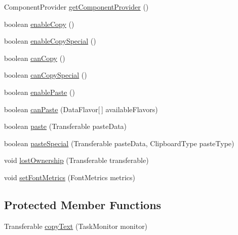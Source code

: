 \begin{DoxyCompactItemize}
\item 
Component\+Provider \mbox{\hyperlink{classghidra_1_1app_1_1plugin_1_1core_1_1decompile_1_1_decompile_clipboard_provider_a7363550b939c99abe51d30fedef7e878}{get\+Component\+Provider}} ()
\item 
boolean \mbox{\hyperlink{classghidra_1_1app_1_1plugin_1_1core_1_1decompile_1_1_decompile_clipboard_provider_a9b89ea1b2c07bfca0cd2734cddf34570}{enable\+Copy}} ()
\item 
boolean \mbox{\hyperlink{classghidra_1_1app_1_1plugin_1_1core_1_1decompile_1_1_decompile_clipboard_provider_a85e63b6db2f8b3ce6bcd5cc088d6b943}{enable\+Copy\+Special}} ()
\item 
boolean \mbox{\hyperlink{classghidra_1_1app_1_1plugin_1_1core_1_1decompile_1_1_decompile_clipboard_provider_a1d4e7ed5bf6f6da3600d38417bc16bc5}{can\+Copy}} ()
\item 
boolean \mbox{\hyperlink{classghidra_1_1app_1_1plugin_1_1core_1_1decompile_1_1_decompile_clipboard_provider_a6413cbcba89647549736f01c80009cb6}{can\+Copy\+Special}} ()
\item 
boolean \mbox{\hyperlink{classghidra_1_1app_1_1plugin_1_1core_1_1decompile_1_1_decompile_clipboard_provider_ada236d81f63f6144d083009933529bd2}{enable\+Paste}} ()
\item 
boolean \mbox{\hyperlink{classghidra_1_1app_1_1plugin_1_1core_1_1decompile_1_1_decompile_clipboard_provider_a4bd3ab12c50c4b447a0c1a9a2f9d8a8d}{can\+Paste}} (Data\+Flavor\mbox{[}$\,$\mbox{]} available\+Flavors)
\item 
boolean \mbox{\hyperlink{classghidra_1_1app_1_1plugin_1_1core_1_1decompile_1_1_decompile_clipboard_provider_a3ece9772dbd27e72c5a40b2618c11257}{paste}} (Transferable paste\+Data)
\item 
boolean \mbox{\hyperlink{classghidra_1_1app_1_1plugin_1_1core_1_1decompile_1_1_decompile_clipboard_provider_aaf15944343864e399fd930f04bfa56c4}{paste\+Special}} (Transferable paste\+Data, Clipboard\+Type paste\+Type)
\item 
void \mbox{\hyperlink{classghidra_1_1app_1_1plugin_1_1core_1_1decompile_1_1_decompile_clipboard_provider_ab84bc64f7d572653cdecb9aee4034139}{lost\+Ownership}} (Transferable transferable)
\item 
void \mbox{\hyperlink{classghidra_1_1app_1_1plugin_1_1core_1_1decompile_1_1_decompile_clipboard_provider_ac1a518e259500fa971bbb361ae6d5ef1}{set\+Font\+Metrics}} (Font\+Metrics metrics)
\end{DoxyCompactItemize}
\subsection*{Protected Member Functions}
\begin{DoxyCompactItemize}
\item 
Transferable \mbox{\hyperlink{classghidra_1_1app_1_1plugin_1_1core_1_1decompile_1_1_decompile_clipboard_provider_aabb3e58f9df2de785e528b4ddc06a285}{copy\+Text}} (Task\+Monitor monitor)
\end{DoxyCompactItemize}


